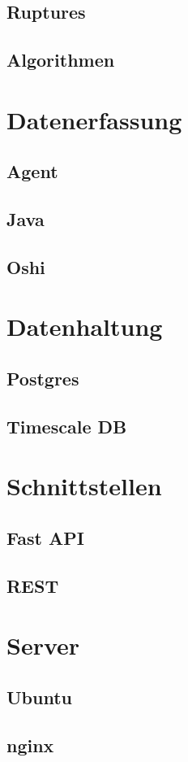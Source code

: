 \documentclass[pdftex,11pt,a4paper]{book}
\begin{document}
\subsection{Ruptures}
\subsection{Algorithmen}
\section{Datenerfassung}
\subsection{Agent}
\subsection{Java}
\subsection{Oshi}
\section{Datenhaltung}
\subsection{Postgres}
\subsection{Timescale DB}
\section{Schnittstellen}
\subsection{Fast API}
\subsection{REST}
\section{Server}
\subsection{Ubuntu}
\subsection{nginx}
\end{document}
